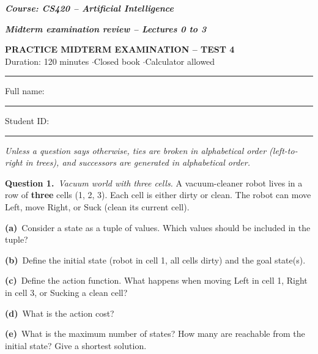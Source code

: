 \documentclass[11pt,a4paper]{article}
\newcommand{\question}[1]{\par\medskip\noindent\textbf{Question #1.}\ }
\newcommand{\subq}[1]{\par\smallskip\noindent\textbf{#1}\ }
\begin{document}
{\large\textbf{\textit{Course: CS420 -- Artificial Intelligence}}}\par
{\textbf{\textit{Midterm examination review -- Lectures 0 to 3}}}\par
\begin{center}{\Large\bfseries PRACTICE MIDTERM EXAMINATION -- TEST 4}\\[3pt]
{\small Duration: 120 minutes \quad$\cdot$\quad Closed book \quad$\cdot$\quad Calculator allowed}\end{center}
\noindent\rule{\linewidth}{0.6pt}

\noindent Full name: \rule{6.5cm}{0.3pt}\hfill Student ID: \rule{4cm}{0.3pt}\par\smallskip
{\small\textit{Unless a question says otherwise, ties are broken in alphabetical order (left-to-right in trees), and successors are generated in alphabetical order.}}\par
\question{1}\textit{Vacuum world with three cells.} A vacuum-cleaner robot lives in a row of \textbf{three} cells (1, 2, 3). Each cell is either dirty or clean. The robot can move Left, move Right, or Suck (clean its current cell).
\subq{(a)}Consider a state as a tuple of values. Which values should be included in the tuple?
\begin{ansbox}[height=0.9cm]\end{ansbox}
\subq{(b)}Define the initial state (robot in cell 1, all cells dirty) and the goal state(s).
\begin{ansbox}[height=0.9cm]\end{ansbox}
\subq{(c)}Define the action function. What happens when moving Left in cell 1, Right in cell 3, or Sucking a clean cell?
\begin{ansbox}[height=1.4cm]\end{ansbox}
\subq{(d)}What is the action cost?
\begin{ansbox}[height=0.6cm]\end{ansbox}
\subq{(e)}What is the maximum number of states? How many are reachable from the initial state? Give a shortest solution.
\begin{ansbox}[height=1.4cm]\end{ansbox}
\end{document}
